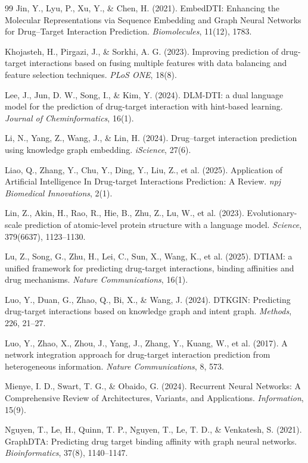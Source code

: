 \documentclass[12pt,a4paper,oneside]{report}
\begin{document}
\begin{thebibliography}{99}
Jin, Y., Lyu, P., Xu, Y., \& Chen, H. (2021).
EmbedDTI: Enhancing the Molecular Representations via Sequence Embedding and Graph Neural Networks for Drug--Target Interaction Prediction.
\textit{Biomolecules}, 11(12), 1783.

Khojasteh, H., Pirgazi, J., \& Sorkhi, A. G. (2023).
Improving prediction of drug-target interactions based on fusing multiple features with data balancing and feature selection techniques.
\textit{PLoS ONE}, 18(8).

Lee, J., Jun, D. W., Song, I., \& Kim, Y. (2024).
DLM-DTI: a dual language model for the prediction of drug-target interaction with hint-based learning.
\textit{Journal of Cheminformatics}, 16(1).

Li, N., Yang, Z., Wang, J., \& Lin, H. (2024).
Drug–target interaction prediction using knowledge graph embedding.
\textit{iScience}, 27(6).

Liao, Q., Zhang, Y., Chu, Y., Ding, Y., Liu, Z., et al. (2025).
Application of Artificial Intelligence In Drug-target Interactions Prediction: A Review.
\textit{npj Biomedical Innovations}, 2(1).

Lin, Z., Akin, H., Rao, R., Hie, B., Zhu, Z., Lu, W., et al. (2023).
Evolutionary-scale prediction of atomic-level protein structure with a language model.
\textit{Science}, 379(6637), 1123--1130.

Lu, Z., Song, G., Zhu, H., Lei, C., Sun, X., Wang, K., et al. (2025).
DTIAM: a unified framework for predicting drug-target interactions, binding affinities and drug mechanisms.
\textit{Nature Communications}, 16(1).

Luo, Y., Duan, G., Zhao, Q., Bi, X., \& Wang, J. (2024).
DTKGIN: Predicting drug-target interactions based on knowledge graph and intent graph.
\textit{Methods}, 226, 21--27.

Luo, Y., Zhao, X., Zhou, J., Yang, J., Zhang, Y., Kuang, W., et al. (2017).
A network integration approach for drug-target interaction prediction from heterogeneous information.
\textit{Nature Communications}, 8, 573.

Mienye, I. D., Swart, T. G., \& Obaido, G. (2024).
Recurrent Neural Networks: A Comprehensive Review of Architectures, Variants, and Applications.
\textit{Information}, 15(9).

Nguyen, T., Le, H., Quinn, T. P., Nguyen, T., Le, T. D., \& Venkatesh, S. (2021).
GraphDTA: Predicting drug target binding affinity with graph neural networks.
\textit{Bioinformatics}, 37(8), 1140--1147.


\end{thebibliography}
\end{document}
